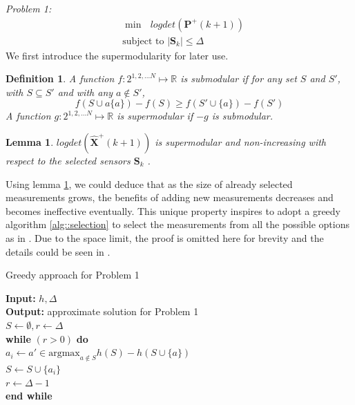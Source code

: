 \documentclass[conference]{IEEEtran}
\newtheorem{lemma}{Lemma}
\newtheorem{definition}{Definition}
\begin{document}
\emph{Problem 1:}
\begin{equation}
\begin{split}
&\min   \text{   } logdet(\boldsymbol{P}^+(k+1))
\\
&\text{subject to } |\boldsymbol{S}_k| \leq \Delta
\end{split}
\label{equ::opt_1}
\end{equation}
We first introduce the supermodularity for later use.
\begin{definition}
	A function $f:2^{1,2,...N} \mapsto \mathbb{R}$ is submodular if for any set $S$ and $S'$, with $S\subseteq S'$ and with any $a\notin S'$,
	\begin{equation*}
		f(S \cup a\{a\}) - f(S) \geq f(S' \cup \{a\}) - f(S')
	\end{equation*}
	A function $g:2^{1,2,...N} \mapsto \mathbb{R}$ is supermodular if $-g$ is submodular.
\end{definition}
\begin{lemma}
	$logdet(\hat{\boldsymbol{X}}^+(k+1))$ is supermodular and non-increasing with respect to the selected sensors $\boldsymbol{S}_k$ \cite{tzoumas2016sensor}.
	\label{lemma::1}
\end{lemma}
Using lemma \ref{lemma::1}, we could deduce that as the size of already selected measurements grows, the benefits of adding new measurements decreases and becomes ineffective eventually.
This unique property inspires to adopt a greedy algorithm \ref{alg::selection} to select the measurements from all the possible options as in \cite{tzoumas2016sensor}.
Due to the space limit, the proof is omitted here for brevity and the details could be seen in \cite{tzoumas2016sensor,tzoumas2018selecting}.

\begin{algorithm}
	\caption{Greedy approach for Problem 1}
	\textbf{Input:} $h,\Delta$ \\
	\textbf{Output: } approximate solution for Problem 1 \\
	$S \leftarrow \emptyset, r \leftarrow \Delta $\\
	\textbf{while} $(r>0)$ \textbf{do} \\
		$a_i \leftarrow a'\in \text{argmax}_{a\notin S} h(S) - h(S\cup \{a\})$ \\
		$S \leftarrow S \cup \{a_i\}$\\
		$r\leftarrow \Delta - 1$\\
	\textbf{end while}
	\label{alg::selection}
\end{algorithm}
\end{document}
